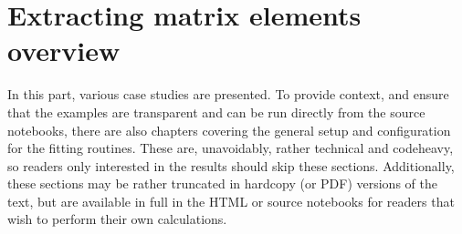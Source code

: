 \documentclass[letterpaper,table,10pt,english]{jupyterBook}
\begin{document}
\chapter{Extracting matrix elements overview}
\label{\detokenize{part2/extracting_matrix_elements_overview_270423:extracting-matrix-elements-overview}}\label{\detokenize{part2/extracting_matrix_elements_overview_270423:chpt-extracting-matrix-elements-overview}}\label{\detokenize{part2/extracting_matrix_elements_overview_270423::doc}}
\sphinxAtStartPar
In this part, various case studies are presented. To provide context, and ensure that the examples are transparent and can be run directly from the source notebooks, there are also chapters covering the general setup and configuration for the fitting routines. These are, unavoidably, rather technical and code\sphinxhyphen{}heavy, so readers only interested in the results should skip these sections. Additionally, these sections may be rather truncated in hard\sphinxhyphen{}copy (or PDF) versions of the text, but are available in full in the HTML or source notebooks for readers that wish to perform their own calculations.
\end{document}
